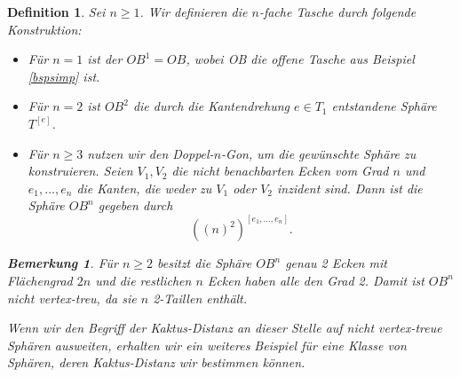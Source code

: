 \documentclass[12pt,titlepage,twoside,cleardoublepage]{article}
\theoremstyle{nummermitklammern}
\newtheorem{definition}[temp]{Definition}
\newtheorem{bemerkung}[temp]{Bemerkung}
\newtheorem{definition}[zahl]{Definition}
\newtheorem{bemerkung}[zahl]{Bemerkung}
\numberwithin{equation}{section}
\begin{document}
\begin{definition}
Sei $n\geq 1$. Wir definieren die \emph{$n$-fache Tasche} durch folgende Konstruktion:
\begin{itemize}
\item Für $n=1$ ist der $OB^1=OB$, wobei OB die offene Tasche aus Beispiel \ref{bspsimp} ist.
\item Für $n=2$ ist $OB^2$ die durch die Kantendrehung $e\in T_1$ entstandene Sphäre $T^{[e]}$.
\item Für $n\geq 3$ nutzen wir den Doppel-$n$-Gon, um die gewünschte Sphäre zu konstruieren. Seien $V_1,V_2$ die nicht benachbarten Ecken vom Grad $n$ und $e_1,\ldots, e_n$ die Kanten, die weder zu $V_1$ oder $V_2$ inzident sind. Dann ist die Sphäre $OB^n$ gegeben durch
\[
{((n)^2)}^{[e_1,\ldots,e_n]}.
\]
\end{itemize}
\begin{bemerkung}
Für $n\geq 2$ besitzt die Sphäre $OB^n$ genau 2 Ecken mit Flächengrad $2n$ und die restlichen $n$ Ecken haben alle den Grad 2. Damit ist $OB^n$ nicht vertex-treu, da sie $n$ 2-Taillen enthält.
\end{bemerkung}
Wenn wir den Begriff der Kaktus-Distanz an dieser Stelle auf nicht vertex-treue Sphären ausweiten, erhalten wir ein weiteres Beispiel für eine Klasse von Sphären, deren Kaktus-Distanz wir bestimmen können. 

\end{definition}
\end{document}
